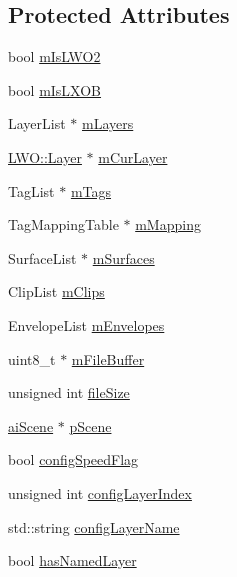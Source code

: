 \subsection*{Protected Attributes}
\begin{DoxyCompactItemize}
\item 
bool \hyperlink{class_assimp_1_1_l_w_o_importer_aa5df677055718f70b6af72f342879e48}{m\+Is\+L\+W\+O2}
\item 
bool \hyperlink{class_assimp_1_1_l_w_o_importer_a44c58156ab0b73965435b088678e4660}{m\+Is\+L\+X\+O\+B}
\item 
Layer\+List $\ast$ \hyperlink{class_assimp_1_1_l_w_o_importer_a7db7299c8200eec4c4cf2f2d38de0a3f}{m\+Layers}
\item 
\hyperlink{struct_assimp_1_1_l_w_o_1_1_layer}{L\+W\+O\+::\+Layer} $\ast$ \hyperlink{class_assimp_1_1_l_w_o_importer_a374ca57f0bcdb7b2c8531aec4880b92a}{m\+Cur\+Layer}
\item 
Tag\+List $\ast$ \hyperlink{class_assimp_1_1_l_w_o_importer_a7c789687d870766d0fbe48d048a13b38}{m\+Tags}
\item 
Tag\+Mapping\+Table $\ast$ \hyperlink{class_assimp_1_1_l_w_o_importer_a53e4d9054d066d95cce5298e27ba0e68}{m\+Mapping}
\item 
Surface\+List $\ast$ \hyperlink{class_assimp_1_1_l_w_o_importer_a6afb05a63b747556808f428455a9b812}{m\+Surfaces}
\item 
Clip\+List \hyperlink{class_assimp_1_1_l_w_o_importer_acf34094d88a0687d50b8bb3b29daedc3}{m\+Clips}
\item 
Envelope\+List \hyperlink{class_assimp_1_1_l_w_o_importer_aa70735485e64f3d1464ed59a1fd66599}{m\+Envelopes}
\item 
uint8\+\_\+t $\ast$ \hyperlink{class_assimp_1_1_l_w_o_importer_a6c2025aee6fb01201ec7e06d57e8b991}{m\+File\+Buffer}
\item 
unsigned int \hyperlink{class_assimp_1_1_l_w_o_importer_af3cbffdb7546965aec708172204077ab}{file\+Size}
\item 
\hyperlink{structai_scene}{ai\+Scene} $\ast$ \hyperlink{class_assimp_1_1_l_w_o_importer_a3d95e70dd9a82a809f3d4d97df2e6d46}{p\+Scene}
\item 
bool \hyperlink{class_assimp_1_1_l_w_o_importer_a5a0eb7f9f08aa4177621b6f297894e31}{config\+Speed\+Flag}
\item 
unsigned int \hyperlink{class_assimp_1_1_l_w_o_importer_a510a869ff88dbb10101aeb11b87bc2e1}{config\+Layer\+Index}
\item 
std\+::string \hyperlink{class_assimp_1_1_l_w_o_importer_a8f2789b53c2e96273ca1103be5bc1cf5}{config\+Layer\+Name}
\item 
bool \hyperlink{class_assimp_1_1_l_w_o_importer_ac742f8720adcaac0e1355f9d1cfe847c}{has\+Named\+Layer}
\end{DoxyCompactItemize}
